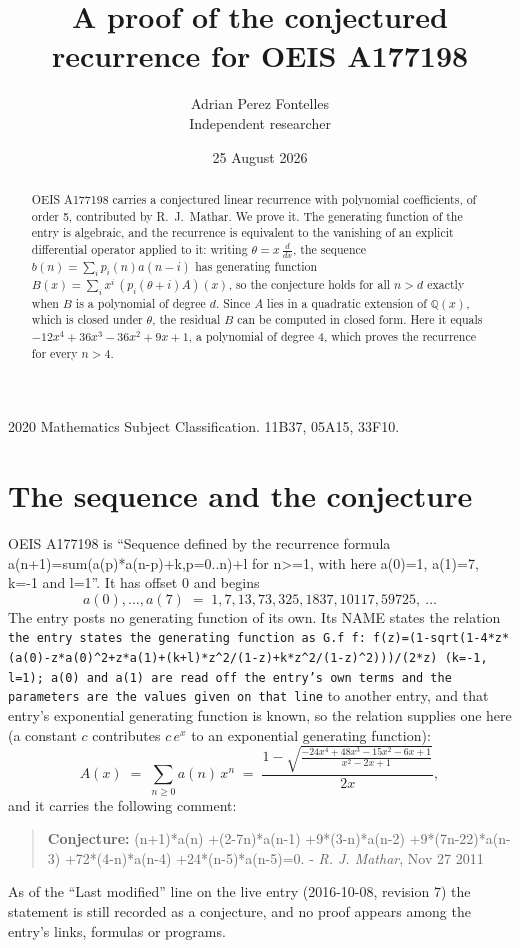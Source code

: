 \documentclass[11pt,a4paper]{article}
\title{A proof of the conjectured recurrence for OEIS A177198}
\author{Adrian Perez Fontelles\\ \small Independent researcher}
\date{25 August 2026}
\theoremstyle{plain}
\theoremstyle{definition}
\begin{document}
\maketitle

\begin{abstract}
OEIS A177198 carries a conjectured linear recurrence with polynomial coefficients, of
order 5, contributed by R.~J.~Mathar. We prove it. The generating function of the
entry is algebraic, and the recurrence is equivalent to the vanishing of an explicit
differential operator applied to it: writing $\theta=x\,\frac{d}{dx}$, the sequence
$b(n)=\sum_{i}p_{i}(n)a(n-i)$ has generating function
$B(x)=\sum_{i}x^{i}\,(p_{i}(\theta+i)A)(x)$, so the conjecture holds for all $n>d$ exactly
when $B$ is a polynomial of degree $d$. Since $A$ lies in a quadratic extension of
$\mathbb{Q}(x)$, which is closed under $\theta$, the residual $B$ can be computed in
closed form. Here it equals $- 12 x^{4} + 36 x^{3} - 36 x^{2} + 9 x + 1$, a polynomial of degree $4$, which proves
the recurrence for every $n>4$.
\end{abstract}

\noindent\small 2020 Mathematics Subject Classification. 11B37, 05A15, 33F10.\normalsize

\section{The sequence and the conjecture}

OEIS A177198 is ``Sequence defined by the recurrence formula a(n+1)=sum(a(p)*a(n-p)+k,p=0..n)+l for n>=1, with here a(0)=1, a(1)=7, k=-1 and l=1''. It has offset $0$ and begins
\[
a(0),\dots,a(7)\;=\;1, 7, 13, 73, 325, 1837, 10117, 59725,\ \dots
\]
The entry posts no generating function of its own. Its NAME states the
relation \texttt{the entry states the generating function as G.f f: f(z)=(1-sqrt(1-4*z*(a(0)-z*a(0)\textasciicircum{}2+z*a(1)+(k+l)*z\textasciicircum{}2/(1-z)+k*z\textasciicircum{}2/(1-z)\textasciicircum{}2)))/(2*z) (k=-1, l=1); a(0) and a(1) are read off the entry's own terms and the parameters are the values given on that line} to another entry, and that entry's exponential generating
function is known, so the relation supplies one here (a constant $c$ contributes
$c\,e^{x}$ to an exponential generating function):
\begin{equation}\label{eq:gf}
A(x)\;=\;\sum_{n\ge 0} a(n)\,x^{n}\;=\;\frac{1 - \sqrt{\frac{- 24 x^{4} + 48 x^{3} - 15 x^{2} - 6 x + 1}{x^{2} - 2 x + 1}}}{2 x} ,
\end{equation}
and it carries the following comment:
\begin{quote}\small
\textbf{Conjecture:} (n+1)*a(n) +(2-7n)*a(n-1) +9*(3-n)*a(n-2) +9*(7n-22)*a(n-3) +72*(4-n)*a(n-4) +24*(n-5)*a(n-5)=0. - \emph{R. J. Mathar}, Nov 27 2011
\end{quote}
As of the ``Last modified'' line on the live entry (2016-10-08, revision 7) the
statement is still recorded as a conjecture, and no proof appears among the entry's links,
formulas or programs.
\end{document}
